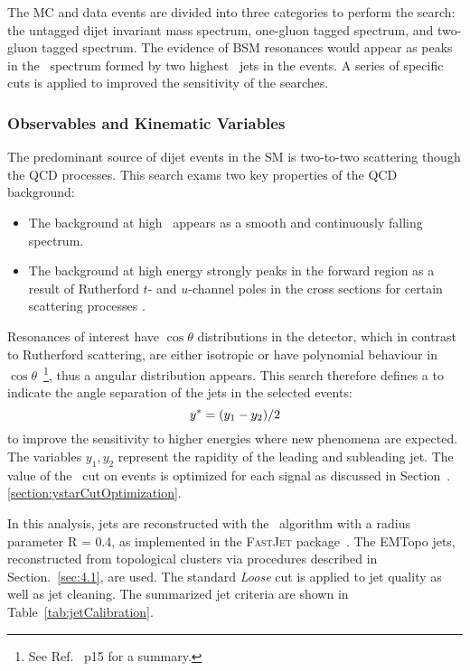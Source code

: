 The MC and data events are divided into three categories to perform the search: the untagged dijet invariant mass spectrum, one-gluon tagged spectrum, and two-gluon tagged spectrum. The evidence of BSM resonances would appear as peaks in the \mjj~spectrum formed by two highest \pt~jets in the events. A series of specific cuts is applied to improved the sensitivity of the searches.


\subsubsection{Observables and Kinematic Variables}
The predominant source of dijet
events in the SM is two-to-two scattering though the QCD processes. This search exams two key properties of the QCD background:
\begin{itemize}
	\item The background at high \mjj~appears as a smooth and continuously falling spectrum.
	\item The background at high energy strongly peaks in the forward region as a result of Rutherford $t$- and $u$-channel poles in the cross sections
for certain scattering processes \cite{Harris:2011bh}.
\end{itemize}

Resonances of interest have $\cos{\theta}$ distributions in the detector, which in contrast to Rutherford scattering, are either isotropic or have polynomial behaviour in $\cos{\theta}$~\footnote{See Ref.~\cite{Harris:2011bh} p15 for a summary.}, thus a angular distribution appears. This search therefore defines a \ystar to indicate the angle separation of the jets in the selected events:
\begin{equation}
 y^\ast = (y_1-y_2)/2
\end{equation}
to improve the sensitivity to higher energies where new phenomena are expected. The variables $y_1, y_2$ represent the rapidity of the leading and subleading jet. The value of the \ystar\ cut on events is optimized for each signal as discussed in Section~.\ref{section:ystarCutOptimization}.


In this analysis, jets are reconstructed with the \akt~algorithm
with a radius parameter R = 0.4, as implemented in the \textsc{FastJet}
package~\cite{Cacciari:2011ma}.  The EMTopo jets, reconstructed from topological clusters via procedures described in Section.~\ref{sec:4.1}, are used. The standard \textit{Loose} cut is applied to jet quality as well as jet cleaning. The summarized jet criteria are shown in Table~\ref{tab:jetCalibration}.

